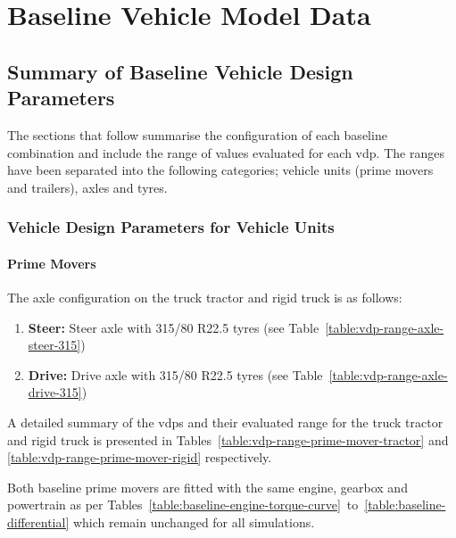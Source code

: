 \chapter{Baseline Vehicle Model Data}\label{appendix:baseline-models}

\section{Summary of Baseline Vehicle Design Parameters}\label{section:summary-of-evaluted-vehicle-design-parameters}

The sections that follow summarise the configuration of each baseline combination and include the range of values evaluated for each \gls{vdp}. The ranges have been separated into the following categories; vehicle units (prime movers and trailers), axles and tyres.

\subsection{Vehicle Design Parameters for Vehicle Units}\label{section:summary-of-vehicle-unit-design-parameters}

\subsubsection{Prime Movers}\label{section:vdp-range-prime-mover}

The axle configuration on the truck tractor and rigid truck is as follows:

\begin{enumerate}
	\item \textbf{Steer:} Steer axle with 315/80 R22.5 tyres (see Table~\ref{table:vdp-range-axle-steer-315})
	\item \textbf{Drive:} Drive axle with 315/80 R22.5 tyres (see Table~\ref{table:vdp-range-axle-drive-315})
\end{enumerate}

A detailed summary of the \glspl{vdp} and their evaluated range for the truck tractor and rigid truck is presented in Tables~\ref{table:vdp-range-prime-mover-tractor} and \ref{table:vdp-range-prime-mover-rigid} respectively.

Both baseline prime movers are fitted with the same engine, gearbox and powertrain as per Tables~\ref{table:baseline-engine-torque-curve}~to~\ref{table:baseline-differential} which remain unchanged for all simulations.

